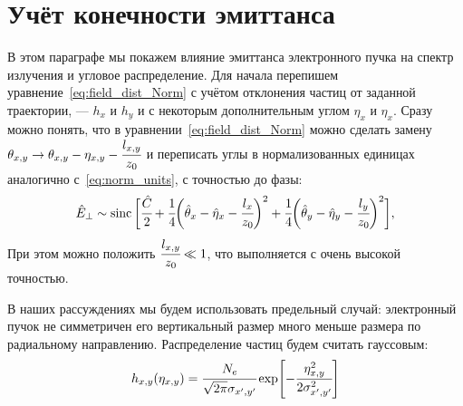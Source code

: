 \section{Учёт конечности эмиттанса}
В этом параграфе мы покажем влияние эмиттанса электронного пучка на спектр излучения и угловое распределение. Для начала перепишем уравнение~\ref{eq:field_dist_Norm} с учётом отклонения частиц от заданной траектории, --- $h_x$ и $h_y$ и с некоторым дополнительным углом $\eta_x$ и $\eta_x$. Сразу можно понять, что в уравнении~\ref{eq:field_dist_Norm} можно сделать замену $\theta_{x,y} \rightarrow \theta_{x,y} - \eta_{x, y} - \cfrac{l_{x,y}}{z_0}$ и переписать углы в нормализованных единицах аналогично с~\ref{eq:norm_units}, с точностью до фазы: 
\begin{equation}
	\label{eq:field_dist_Norm}
	\begin{array}{lcl}
	\hat{E}_{\bot} \sim
	\operatorname{sinc}\bigg[\cfrac{\hat{C}}{2} + 
	\cfrac{1}{4}\bigg(\hat{\theta}_{x} - \hat{\eta}_{x} - \cfrac{l_{x}}{z_0}\bigg)^2 +
	\cfrac{1}{4}\bigg(\hat{\theta}_{y} - \hat{\eta}_{y} - \cfrac{l_{y}}{z_0}\bigg)^2\bigg],
	\end{array}	
\end{equation}
При этом можно положить  $\cfrac{l_{x,y}}{z_0} \ll 1$, что выполняется с очень высокой точностью. 

В наших рассуждениях мы будем использовать предельный случай: электронный пучок не симметричен его вертикальный размер много меньше размера по радиальному направлению. Распределение частиц будем считать гауссовым: 
\begin{equation}
	\label{eq:field_dist_Norm}
	h_{x, y}(\eta_{x, y}) = \cfrac{N_e}{\sqrt{2\pi}\sigma_{x', y'}} \exp[-\cfrac{\eta^2_{x, y}}{2\sigma^2_{x', y'}}]
\end{equation}

